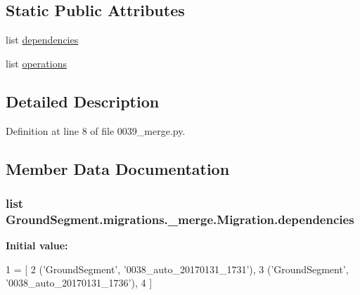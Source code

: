\subsection*{Static Public Attributes}
\begin{DoxyCompactItemize}
\item 
list \hyperlink{class_ground_segment_1_1migrations_1_10039__merge_1_1_migration_a99fe0880ff9955b72c6d26d1d1ed5d24}{dependencies}
\item 
list \hyperlink{class_ground_segment_1_1migrations_1_10039__merge_1_1_migration_a188fcb0bf9e1058b1d870d765532f255}{operations}
\end{DoxyCompactItemize}


\subsection{Detailed Description}


Definition at line 8 of file 0039\+\_\+merge.\+py.



\subsection{Member Data Documentation}
\hypertarget{class_ground_segment_1_1migrations_1_10039__merge_1_1_migration_a99fe0880ff9955b72c6d26d1d1ed5d24}{}
\subsubsection[{dependencies}]{\setlength{\rightskip}{0pt plus 5cm}list Ground\+Segment.\+migrations.\+\_\+merge.\+Migration.\+dependencies\hspace{0.3cm}{\ttfamily [static]}}\label{class_ground_segment_1_1migrations_1_10039__merge_1_1_migration_a99fe0880ff9955b72c6d26d1d1ed5d24}
{\bfseries Initial value\+:}
\begin{DoxyCode}
1 = [
2         (\textcolor{stringliteral}{'GroundSegment'}, \textcolor{stringliteral}{'0038\_auto\_20170131\_1731'}),
3         (\textcolor{stringliteral}{'GroundSegment'}, \textcolor{stringliteral}{'0038\_auto\_20170131\_1736'}),
4     ]
\end{DoxyCode}



